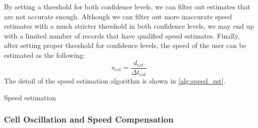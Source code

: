 By setting a threshold for both confidence levels, we can filter out estimates that are not accurate enough. Although we can filter out more inaccurate speed estimates with a much stricter threshold in both confidence levels, we may end up with a limited number of records that have qualified speed estimates. Finally, after setting proper threshold for confidence levels, the speed of the user can be estimated as the following:
\begin{equation}
  s_{est} = \frac{d_{est}}{\Delta t_{est}}
\end{equation}
The detail of the speed estimation algorithm is shown in \autoref{alg:speed_est}.


\begin{algorithm}
 \caption{Speed estimation}\label{alg:speed_est}
\end{algorithm}


\subsubsection{Cell Oscillation and Speed Compensation}\label{sec:Oscillation}

